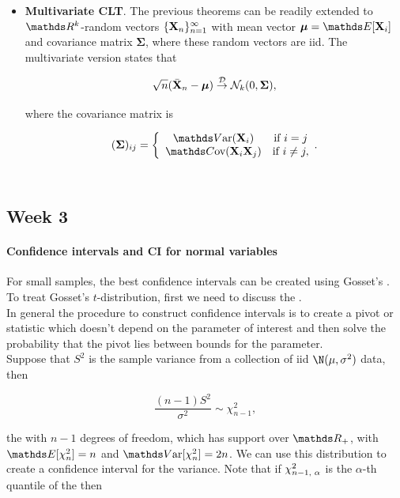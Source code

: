 \documentclass{homework}
\begin{document}
\begin{itemize}
   \item \textbf{Multivariate CLT}. The previous theorems can be readily extended to $\R^k$-random vectors $\{{\bf X}_n\}_{n=1}^{\infty}$ with mean vector $\bm{\mu}=\E[\X_i]$ and covariance matrix $\bm{\Sigma}$, where these random vectors are iid. The multivariate version states that 
   
   $$
   \sqrt{n}(\bar{{\bf X}}_n - \bm{\mu}) \overset{\mathcal{D}}{\rightarrow} \mathcal{N}_k (0, \bm{\Sigma}),
   $$
   
   where the covariance matrix is 
   
   $$
   (\bm{\Sigma})_{ij} = \bigg\{ \begin{array}{ccc}
       \var(\X_i)  & \textnormal{if } i=j  \\
       \cov(\X_i \X_j)  & \textnormal{if } i \neq j, 
    \end{array}.
   $$ \\
\end{itemize}

\subsection{Week 3}

\paragraph{\textbf{Confidence intervals and CI for normal variables }}

For small samples, the best confidence intervals can be created using Gosset's \tdis. To treat Gosset's $t$-distribution, first we need to discuss the \chidis. \\

In general the procedure to construct confidence intervals is to create a pivot or statistic which doesn't depend on the parameter of interest and then solve the probability that the pivot lies between bounds for the parameter. \\

Suppose that $S^2$ is the sample variance from a collection of iid $\N(\mu, \sigma^2)$ data, then 

$$
\frac{(n-1)S^2}{\sigma^2} \sim \chi^2_{n-1},
$$

the \chidis  with $n-1$ degrees of freedom, which has support over $\Rp$, with $\E[\chi^2_{n}] = n$ and $\var[\chi^2_{n}] = 2n$. We can use this distribution to create a confidence interval for the variance. Note that if $\chi^2_{n-1, \textnormal{ }\alpha}$ is the $\alpha$-th quantile of the \chidis then
\end{document}
